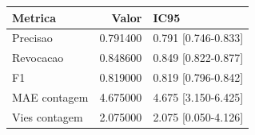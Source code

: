 \begin{tabular}{lrl}
\toprule
Metrica & Valor & IC95 \\
\midrule
Precisao & 0.791400 & 0.791 [0.746-0.833] \\
Revocacao & 0.848600 & 0.849 [0.822-0.877] \\
F1 & 0.819000 & 0.819 [0.796-0.842] \\
MAE contagem & 4.675000 & 4.675 [3.150-6.425] \\
Vies contagem & 2.075000 & 2.075 [0.050-4.126] \\
\bottomrule
\end{tabular}

